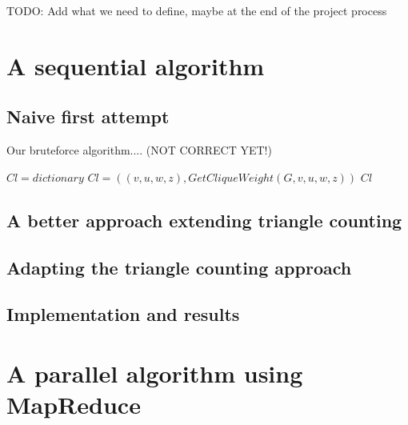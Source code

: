 \documentclass{article}
\begin{document}
TODO: Add what we need to define, maybe at the end of the project process


\section{A sequential algorithm}

\subsection{Naive first attempt}
Our bruteforce algorithm.... (NOT CORRECT YET!)

\begin{algorithm}
\caption{$Naive Max Edgeweighted 4Clique(G)$}
\begin{algorithmic}
\STATE $Cl = dictionary$
\STATE $Cl = ((v,u,w,z),Get Clique Weight(G,v,u,w,z))$
\ENDIF
\ENDIF
\ENDFOR
\ENDIF
\ENDFOR
\ENDFOR
\ENDFOR
\RETURN $Cl$

\end{algorithmic}
\end{algorithm}

\subsection{A better approach extending triangle counting}

\subsection{Adapting the triangle counting approach}

\subsection{Implementation and results}

\section{A parallel algorithm using MapReduce}
\end{document}

